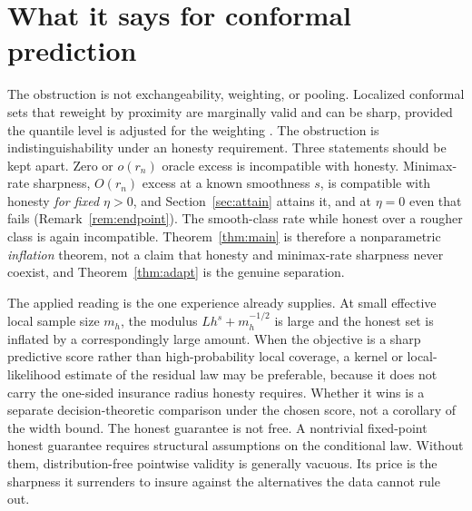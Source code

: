 \documentclass[11pt]{article}
\theoremstyle{definition}
\theoremstyle{remark}
\begin{document}
\section{What it says for conformal prediction}

The obstruction is not exchangeability, weighting, or pooling. Localized conformal sets
that reweight by proximity are marginally valid and can be sharp, provided the quantile level
is adjusted for the weighting \citep{guan2023localized}. The obstruction is
indistinguishability under an honesty requirement. Three statements should be kept apart.
Zero or $o(r_n)$ oracle excess is incompatible with honesty. Minimax-rate sharpness,
$O(r_n)$ excess at a known smoothness $s$, is compatible with honesty \emph{for fixed
$\eta>0$}, and Section~\ref{sec:attain} attains it, and at $\eta=0$ even that fails
(Remark~\ref{rem:endpoint}). The smooth-class rate while honest over a rougher class is
again incompatible. Theorem~\ref{thm:main} is therefore a nonparametric \emph{inflation}
theorem, not a claim that honesty and minimax-rate sharpness never coexist, and
Theorem~\ref{thm:adapt} is the genuine separation.

The applied reading is the one experience already supplies. At small effective local sample
size $m_h$, the modulus $L h^{s} + m_h^{-1/2}$ is large and the honest set is inflated by a
correspondingly large amount. When the objective is a sharp predictive score rather than
high-probability local coverage, a kernel or local-likelihood estimate of the residual law
may be preferable, because it does not carry the one-sided insurance radius honesty
requires. Whether it wins is a separate decision-theoretic comparison under the chosen
score, not a corollary of the width bound. The honest guarantee is not free. A nontrivial
fixed-point honest guarantee requires structural assumptions on the conditional law.
Without them, distribution-free pointwise validity is generally vacuous. Its price is the
sharpness it surrenders to insure against the alternatives the data cannot rule out.
\end{document}
